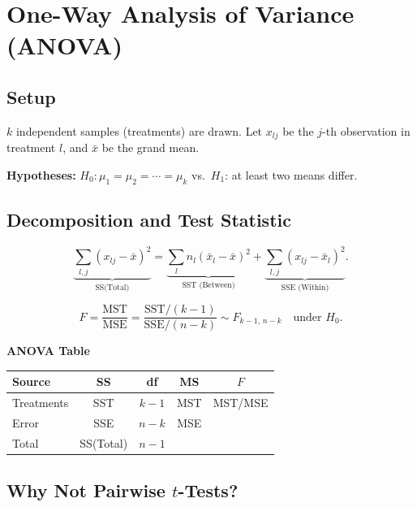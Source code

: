 \documentclass[12pt, a4paper]{article}
\begin{document}
\section{One-Way Analysis of Variance (ANOVA)}

\subsection{Setup}

$k$ independent samples (treatments) are drawn. Let $x_{lj}$ be the $j$-th observation in treatment $l$, and $\bar{x}$ be the grand mean.

\textbf{Hypotheses:} $H_0: \mu_1 = \mu_2 = \cdots = \mu_k$ vs.\ $H_1$: at least two means differ.

\subsection{Decomposition and Test Statistic}

\[
  \underbrace{\sum_{l,j}(x_{lj}-\bar{x})^2}_{\text{SS(Total)}}
  = \underbrace{\sum_l n_l(\bar{x}_l-\bar{x})^2}_{\text{SST (Between)}}
  + \underbrace{\sum_{l,j}(x_{lj}-\bar{x}_l)^2}_{\text{SSE (Within)}}.
\]

\[
  F = \frac{\text{MST}}{\text{MSE}} = \frac{\text{SST}/(k-1)}{\text{SSE}/(n-k)} \sim F_{k-1,\,n-k} \quad\text{under }H_0.
\]

\begin{keybox}\noindent\textbf{ANOVA Table}\par\smallskip
\begin{center}
\begin{tabular}{lcccc}
\toprule
Source & SS & df & MS & $F$ \\
\midrule
Treatments & SST & $k-1$ & MST & MST/MSE \\
Error      & SSE & $n-k$ & MSE & \\
Total      & SS(Total) & $n-1$ & & \\
\bottomrule
\end{tabular}
\end{center}
\end{keybox}

\subsection{Why Not Pairwise $t$-Tests?}
\end{document}
